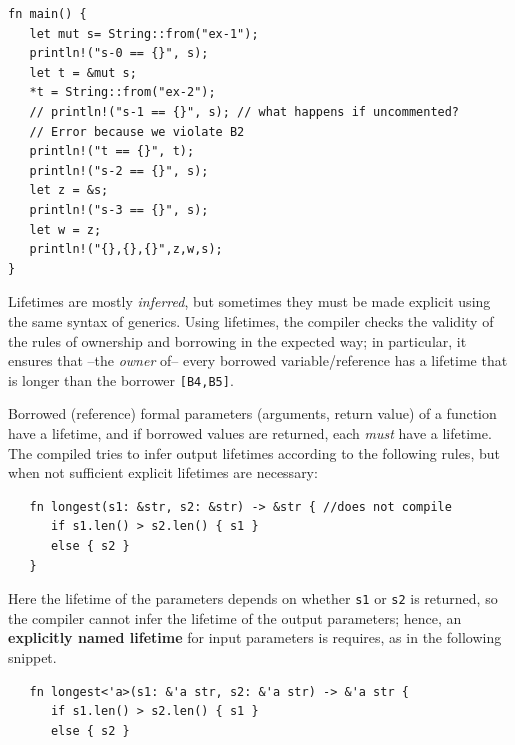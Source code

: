\begin{lstlisting}
fn main() {
   let mut s= String::from("ex-1");
   println!("s-0 == {}", s);
   let t = &mut s;
   *t = String::from("ex-2");
   // println!("s-1 == {}", s); // what happens if uncommented?
   // Error because we violate B2
   println!("t == {}", t);
   println!("s-2 == {}", s);
   let z = &s;
   println!("s-3 == {}", s);
   let w = z;
   println!("{},{},{}",z,w,s);
}
\end{lstlisting}

Lifetimes are mostly \textit{inferred},
but sometimes they must be made explicit using the same syntax of generics.
Using lifetimes, the compiler checks the validity of the
rules of ownership and borrowing in the expected way;
in particular, it ensures that {--}the \textit{owner} of{--} every
borrowed variable/reference has a lifetime that is longer
than the borrower \texttt{[B4,B5]}.
\nl

Borrowed (reference) formal parameters (arguments, return value) of a function have a
lifetime, and  
if borrowed values are returned, each \textit{must} have a lifetime.\\
The compiled tries to infer output lifetimes according to the following rules, but when not sufficient explicit lifetimes are necessary:

\begin{lstlisting}
   fn longest(s1: &str, s2: &str) -> &str { //does not compile
      if s1.len() > s2.len() { s1 }
      else { s2 }
   }
\end{lstlisting}
Here the lifetime of the parameters depends on whether \lstinline|s1| or \lstinline|s2| is returned,
so the compiler cannot infer the lifetime of the output parameters;
hence, an \textbf{explicitly named lifetime} for input parameters is requires, as in the following snippet.
\begin{lstlisting}
   fn longest<'a>(s1: &'a str, s2: &'a str) -> &'a str {
      if s1.len() > s2.len() { s1 }
      else { s2 }
\end{lstlisting}
\newpage

